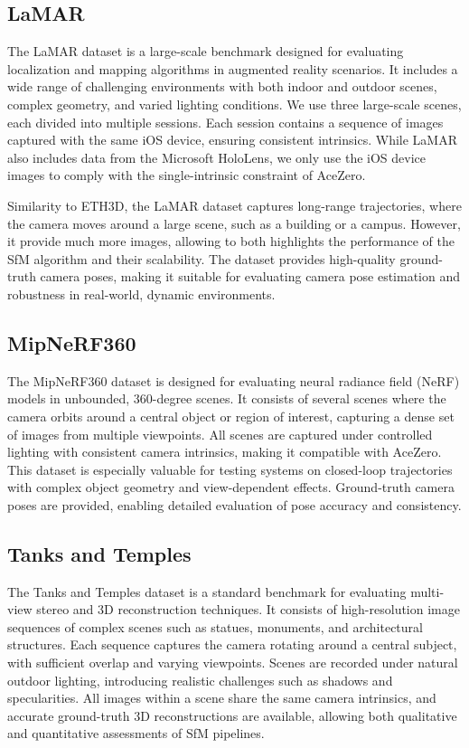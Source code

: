 \subsection{LaMAR}
The LaMAR dataset \cite{sarlin2022lamar} is a large-scale benchmark designed for evaluating localization and mapping algorithms in augmented reality scenarios.
It includes a wide range of challenging environments with both indoor and outdoor scenes, complex geometry, and varied lighting conditions.
We use three large-scale scenes, each divided into multiple sessions. Each session contains a sequence of images captured with the same iOS device, ensuring consistent intrinsics.
While LaMAR also includes data from the Microsoft HoloLens, we only use the iOS device images to comply with the single-intrinsic constraint of AceZero. 

Similarity to ETH3D, the LaMAR dataset captures long-range trajectories, where the camera moves around a large scene, such as a building or a campus. 
However, it provide much more images, allowing to both highlights the performance of the SfM algorithm and their scalability.
The dataset provides high-quality ground-truth camera poses, making it suitable for evaluating camera pose estimation and robustness in real-world, dynamic environments.

\subsection{MipNeRF360}
The MipNeRF360 dataset \cite{barron2022mipnerf360} is designed for evaluating neural radiance field (NeRF) models in unbounded, 360-degree scenes.
It consists of several scenes where the camera orbits around a central object or region of interest, capturing a dense set of images from multiple viewpoints.
All scenes are captured under controlled lighting with consistent camera intrinsics, making it compatible with AceZero. 
This dataset is especially valuable for testing systems on closed-loop trajectories with complex object geometry and view-dependent effects.
Ground-truth camera poses are provided, enabling detailed evaluation of pose accuracy and consistency.

\subsection{Tanks and Temples}
The Tanks and Temples dataset \cite{Knapitsch2017} is a standard benchmark for evaluating multi-view stereo and 3D reconstruction techniques.
It consists of high-resolution image sequences of complex scenes such as statues, monuments, and architectural structures. 
Each sequence captures the camera rotating around a central subject, with sufficient overlap and varying viewpoints.
Scenes are recorded under natural outdoor lighting, introducing realistic challenges such as shadows and specularities.
All images within a scene share the same camera intrinsics, and accurate ground-truth 3D reconstructions are available, allowing both qualitative and quantitative assessments of SfM pipelines.